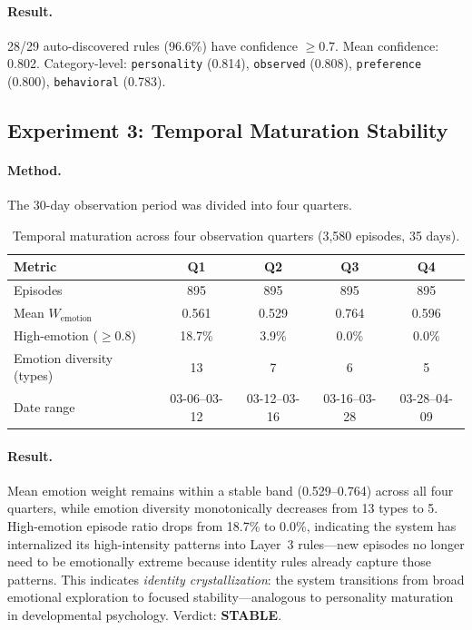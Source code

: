 \documentclass[11pt,a4paper]{article}
\begin{document}
\paragraph{Result.} 28/29 auto-discovered rules (96.6\%) have confidence $\geq 0.7$. Mean
confidence: 0.802. Category-level: \texttt{personality} (0.814), \texttt{observed} (0.808),
\texttt{preference} (0.800), \texttt{behavioral} (0.783).

\subsection{Experiment 3: Temporal Maturation Stability}

\paragraph{Method.} The 30-day observation period was divided into four quarters.

\begin{table}[h]
\centering
\caption{Temporal maturation across four observation quarters (3,580 episodes, 35 days).}
\label{tab:exp3}
\small
\begin{tabular}{@{}lcccc@{}}
\toprule
\textbf{Metric} & \textbf{Q1} & \textbf{Q2} & \textbf{Q3} & \textbf{Q4} \\
\midrule
Episodes              & 895   & 895   & 895  & 895 \\
Mean $W_{\text{emotion}}$ & 0.561 & 0.529 & 0.764 & 0.596 \\
High-emotion ($\geq 0.8$) & 18.7\% & 3.9\% & 0.0\% & 0.0\% \\
Emotion diversity (types)  & 13    & 7     & 6    & 5 \\
Date range             & 03-06--03-12 & 03-12--03-16 & 03-16--03-28 & 03-28--04-09 \\
\bottomrule
\end{tabular}
\end{table}

\paragraph{Result.} Mean emotion weight remains within a stable band (0.529--0.764) across
all four quarters, while emotion diversity monotonically decreases from 13 types to 5.
High-emotion episode ratio drops from 18.7\% to 0.0\%, indicating the system has
internalized its high-intensity patterns into Layer~3 rules---new episodes no longer
need to be emotionally extreme because identity rules already capture those patterns.
This indicates \emph{identity crystallization}: the system transitions from broad
emotional exploration to focused stability---analogous to personality maturation in
developmental psychology. Verdict: \textbf{STABLE}.
\end{document}
